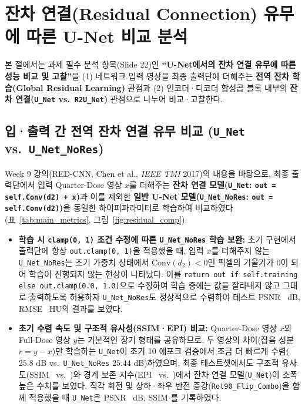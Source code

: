 \documentclass[10pt,a4paper]{article}
\begin{document}
\section{잔차 연결(Residual Connection) 유무에 따른 U-Net 비교 분석}

본 절에서는 과제 필수 분석 항목(Slide 22)인 \textbf{``U-Net에서의 잔차 연결 유무에 따른 성능 비교 및 고찰''}을 (1) 네트워크 입력 영상을 최종 출력단에 더해주는 \textbf{전역 잔차 학습(Global Residual Learning)} 관점과 (2) 인코더·디코더 합성곱 블록 내부의 \textbf{잔차 연결(\texttt{U\_Net} vs.\ \texttt{R2U\_Net})} 관점으로 나누어 비교·고찰한다.

\subsection{입·출력 간 전역 잔차 연결 유무 비교 (\texttt{U\_Net} vs.\ \texttt{U\_Net\_NoRes})}
Week 9 강의(RED-CNN, Chen et al., \textit{IEEE TMI} 2017)의 내용을 바탕으로, 최종 출력단에서 입력 Quarter-Dose 영상 $x$를 더해주는 \textbf{잔차 연결 모델(\texttt{U\_Net}: \texttt{out = self.Conv(d2) + x})}과 이를 제외한 \textbf{일반 U-Net 모델(\texttt{U\_Net\_NoRes}: \texttt{out = self.Conv(d2)})}을 동일한 하이퍼파라미터로 학습하여 비교하였다(표~\ref{tab:main_metrics}, 그림~\ref{fig:residual_comp}).
\begin{itemize}
  \item \textbf{학습 시 \texttt{clamp(0, 1)} 조건 수정에 따른 \texttt{U\_Net\_NoRes} 학습 보완:} 초기 구현에서 출력단에 항상 \texttt{out.clamp(0, 1)}을 적용했을 때, 입력 $x$를 더해주지 않는 \texttt{U\_Net\_NoRes}는 초기 가중치 상태에서 $\mathrm{Conv}(d_2) < 0$인 픽셀의 기울기가 0이 되어 학습이 진행되지 않는 현상이 나타났다. 이를 \texttt{return out if self.training else out.clamp(0.0, 1.0)}으로 수정하여 학습 중에는 값을 잘라내지 않고 그대로 출력하도록 허용하자 \texttt{U\_Net\_NoRes}도 정상적으로 수렴하여 테스트 PSNR \UNetNoResPSNR\ dB, RMSE \UNetNoResRMSEHU\ HU의 결과를 보였다.
  \item \textbf{초기 수렴 속도 및 구조적 유사성(SSIM·EPI) 비교:} Quarter-Dose 영상 $x$와 Full-Dose 영상 $y$는 기본적인 장기 형태를 공유하므로, 두 영상의 차이(잡음 성분 $r = y - x$)만 학습하는 \texttt{U\_Net}이 초기 10 에포크 검증에서 조금 더 빠르게 수렴($25.8\text{ dB}$ vs.\ \texttt{U\_Net\_NoRes} $25.44\text{ dB}$)하였으며, 최종 테스트셋에서도 구조적 유사도(SSIM \UNetSSIM\ vs.\ \UNetNoResSSIM)와 경계 보존 지수(EPI \UNetEPI\ vs.\ \UNetNoResEPI)에서 잔차 연결 모델(\texttt{U\_Net})이 소폭 높은 수치를 보였다. 직각 회전 및 상하·좌우 반전 증강(\texttt{Rot90\_Flip\_Combo})을 함께 적용했을 때 \texttt{U\_Net}은 PSNR \UNetRotFlipPSNR\ dB, SSIM \UNetRotFlipSSIM 를 기록하였다.
\end{itemize}
\end{document}
